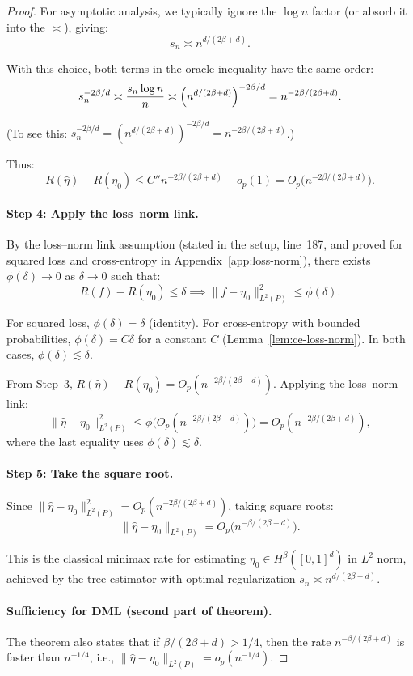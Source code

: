 \documentclass[12pt]{article}
\begin{document}
\begin{proof}
For asymptotic analysis, we typically ignore the $\log n$ factor (or absorb it into the $\asymp$), giving:
\[
s_n \asymp n^{d/(2\beta + d)}.
\]

With this choice, both terms in the oracle inequality have the same order:
\[
s_n^{-2\beta/d} \asymp \frac{s_n \log n}{n} \asymp \Bigl( n^{d/(2\beta+d)} \Bigr)^{-2\beta/d} = n^{-2\beta/(2\beta+d)}.
\]

(To see this: $s_n^{-2\beta/d} = (n^{d/(2\beta+d)})^{-2\beta/d} = n^{-2\beta/(2\beta+d)}$.)

Thus:
\[
R(\hat\eta) - R(\eta_0) \le C'' n^{-2\beta/(2\beta+d)} + o_p(1) = O_p\bigl( n^{-2\beta/(2\beta+d)} \bigr).
\]

\paragraph{Step 4: Apply the loss--norm link.}
By the loss--norm link assumption (stated in the setup, line~187, and proved for squared loss and cross-entropy in Appendix~\ref{app:loss-norm}), there exists $\phi(\delta) \to 0$ as $\delta \to 0$ such that:
\[
R(f) - R(\eta_0) \le \delta \implies \|f - \eta_0\|_{L^2(P)}^2 \le \phi(\delta).
\]

For squared loss, $\phi(\delta) = \delta$ (identity). For cross-entropy with bounded probabilities, $\phi(\delta) = C\delta$ for a constant $C$ (Lemma~\ref{lem:ce-loss-norm}). In both cases, $\phi(\delta) \lesssim \delta$.

From Step~3, $R(\hat\eta) - R(\eta_0) = O_p(n^{-2\beta/(2\beta+d)})$. Applying the loss--norm link:
\[
\|\hat\eta - \eta_0\|_{L^2(P)}^2 \le \phi\bigl( O_p(n^{-2\beta/(2\beta+d)}) \bigr) = O_p(n^{-2\beta/(2\beta+d)}),
\]
where the last equality uses $\phi(\delta) \lesssim \delta$.

\paragraph{Step 5: Take the square root.}
Since $\|\hat\eta - \eta_0\|_{L^2(P)}^2 = O_p(n^{-2\beta/(2\beta+d)})$, taking square roots:
\[
\|\hat\eta - \eta_0\|_{L^2(P)} = O_p\bigl( n^{-\beta/(2\beta+d)} \bigr).
\]

This is the classical minimax rate for estimating $\eta_0 \in H^\beta([0,1]^d)$ in $L^2$ norm, achieved by the tree estimator with optimal regularization $s_n \asymp n^{d/(2\beta+d)}$.

\paragraph{Sufficiency for DML (second part of theorem).}
The theorem also states that if $\beta/(2\beta+d) > 1/4$, then the rate $n^{-\beta/(2\beta+d)}$ is faster than $n^{-1/4}$, i.e., $\|\hat\eta - \eta_0\|_{L^2(P)} = o_p(n^{-1/4})$.


\end{proof}
\end{document}
